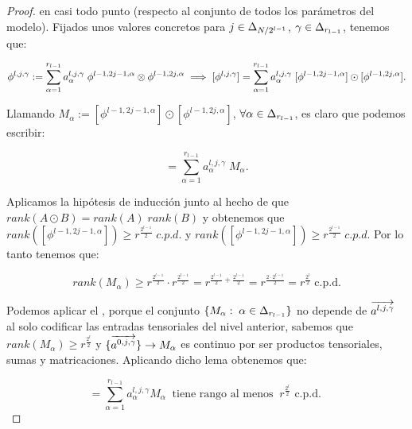 \begin{proof}
    en casi todo punto (respecto al conjunto de todos los parámetros del modelo). Fijados unos valores concretos para $j \in \Delta_{N/2^{l-1}}$, $\gamma \in \Delta_{r_{l-1}}$, tenemos que:

    \begin{equation}
        \phi^{l, j, \gamma} := \sum_{\alpha = 1}^{r_{l-1}} a_{\alpha}^{l, j, \gamma} \; \phi^{l-1, 2j-1, \alpha} \otimes \phi^{l-1, 2j, \alpha} \implies [\phi^{l, j, \gamma}] = \sum_{\alpha = 1}^{r_{l-1}} a_{\alpha}^{l, j, \gamma} \; [\phi^{l-1, 2j-1, \alpha}] \odot [\phi^{l-1, 2j, \alpha}].
    \end{equation}

    Llamando $M_\alpha := [\phi^{l-1, 2j-1, \alpha}] \odot [\phi^{l-1, 2j, \alpha}]$, $\forall \alpha \in \Delta_{r_{l-1}}$, es claro que podemos escribir:

    \begin{equation}
        [\phi^{l, j, \gamma}] = \sum_{\alpha = 1}^{r_{l-1}} a_{\alpha}^{l, j, \gamma} \; M_\alpha.
    \end{equation}

    Aplicamos la hipótesis de inducción junto al hecho de que $rank(A \odot B) = rank(A) \; rank(B)$ y obtenemos que $rank([\phi^{l-1, 2j-1, \alpha}]) \geq r^{\frac{2^{l-1}}{2}} \; c.p.d.$ y $rank([\phi^{l-1, 2j-1, \alpha}]) \geq r^{\frac{2^{l-1}}{2}} \; c.p.d.$ Por lo tanto tenemos que:

    \begin{equation}
        rank(M_\alpha) \geq r^{\frac{2^{l-1}}{2}} \cdot r^{\frac{2^{l-1}}{2}} = r^{\frac{2^{l-1}}{2} + \frac{2^{l-1}}{2}} =
        r^{\frac{2 \cdot 2^{l - 1}}{2}} = r^{\frac{2^{l}}{2}} \; \text{c.p.d.}
    \end{equation}

    Podemos aplicar el , porque el conjunto $\{ M_\alpha: \; \alpha \in \Delta_{r_{l-1}} \}$ no depende de $\overrightarrow{a^{l, j, \gamma}}$ al solo codificar las entradas tensoriales del nivel anterior, sabemos que $rank(M_\alpha) \geq r^{\frac{2^l}{2}}$ y $\{ \overrightarrow{a^{0, j, \gamma}} \} \to M_\alpha$ es continuo por ser productos tensoriales, sumas y matricaciones. Aplicando dicho lema obtenemos que:

    \begin{equation}
        [\phi^{l, j, \gamma}] = \sum_{\alpha = 1}^{r_{l-1}} a_\alpha^{l,j,\gamma} M_\alpha \;\; \text{tiene rango al menos} \; \; r^{\frac{2^l}{2}} \text{ c.p.d. }
    \end{equation}


\end{proof}
